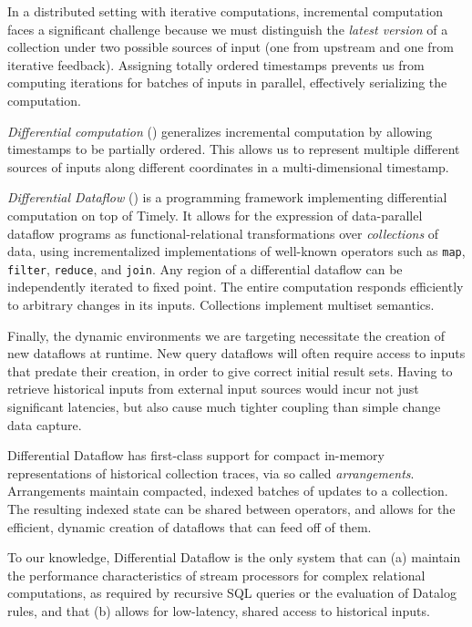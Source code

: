 \documentclass[../index.tex]{subfiles}
\begin{document}
In a distributed setting with iterative computations, incremental
computation faces a significant challenge because we must distinguish
the \emph{latest version} of a collection under two possible sources
of input (one from upstream and one from iterative
feedback). Assigning totally ordered timestamps prevents us from
computing iterations for batches of inputs in parallel, effectively
serializing the computation.

\emph{Differential computation} (\cite{mcsherry2013differential})
generalizes incremental computation by allowing timestamps to be
partially ordered. This allows us to represent multiple different
sources of inputs along different coordinates in a multi-dimensional
timestamp.

\emph{Differential Dataflow} (\cite{differential}) is a programming
framework implementing differential computation on top of Timely. It
allows for the expression of data-parallel dataflow programs as
functional-relational transformations over \emph{collections} of data,
using incrementalized implementations of well-known operators such as
\texttt{map}, \texttt{filter}, \texttt{reduce}, and \texttt{join}. Any
region of a differential dataflow can be independently iterated to
fixed point. The entire computation responds efficiently to arbitrary
changes in its inputs. Collections implement multiset semantics.

Finally, the dynamic environments we are targeting necessitate the
creation of new dataflows at runtime. New query dataflows will often
require access to inputs that predate their creation, in order to give
correct initial result sets. Having to retrieve historical inputs from
external input sources would incur not just significant latencies, but
also cause much tighter coupling than simple change data capture.

Differential Dataflow has first-class support for compact in-memory
representations of historical collection traces, via so called
\emph{arrangements}. Arrangements maintain compacted, indexed batches
of updates to a collection. The resulting indexed state can be shared
between operators, and allows for the efficient, dynamic creation of
dataflows that can feed off of them.

To our knowledge, Differential Dataflow is the only system that can
(a) maintain the performance characteristics of stream processors for
complex relational computations, as required by recursive SQL queries
or the evaluation of Datalog rules, and that (b) allows for
low-latency, shared access to historical inputs.
\end{document}
